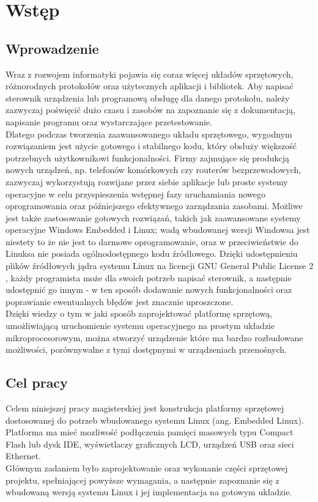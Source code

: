 \documentclass[a4paper,12pt]{book}
\begin{document}
	\tableofcontents


	\chapter{Wstęp}
		\section{Wprowadzenie}
			Wraz z rozwojem informatyki pojawia się coraz więcej układów sprzętowych, różnorodnych protokołów oraz użytecznych aplikacji i bibliotek. Aby napisać sterownik urządzenia lub programową obsługę dla danego protokołu, należy zazwyczaj poświęcić dużo czasu i zasobów na zapoznanie się z dokumentacją, napisanie programu oraz wystarczające przetestowanie.\\
			Dlatego podczas tworzenia zaawansowanego układu sprzętowego, wygodnym rozwiązaniem jest użycie gotowego i stabilnego kodu, który obsłuży większość potrzebnych użytkownikowi funkcjonalności. Firmy zajmujące się produkcją nowych urządzeń, np. telefonów komórkowych czy routerów bezprzewodowych, zazwyczaj wykorzystują rozwijane przez siebie aplikacje lub proste systemy operacyjne w celu przyspieszenia wstępnej fazy uruchamiania nowego oprogramowania oraz późniejszego efektywnego zarządzania zasobami. Możliwe jest także zastosowanie gotowych rozwiązań, takich jak zaawansowane systemy operacyjne Windows Embedded i Linux; wadą wbudowanej wersji Windowsa jest niestety to że nie jest to darmowe oprogramowanie, oraz w przeciwieństwie do Linuksa nie posiada ogólnodostępnego kodu źródłowego. Dzięki udostępnieniu plików źródłowych jądra systemu Linux na licencji GNU General Public License 2 \cite{gnu_gpl_v2}, każdy programista może dla swoich potrzeb napisać sterownik, a następnie udostępnić go innym - w ten sposób dodawanie nowych funkcjonalności oraz poprawianie ewentualnych błędów jest znacznie uproszczone.\\
			Dzięki wiedzy o tym w jaki sposób zaprojektować platformę sprzętową, umożliwiającą uruchomienie systemu operacyjnego na prostym układzie mikroprocesorowym, można stworzyć urządzenie które ma bardzo rozbudowane możliwości, porównywalne z tymi dostępnymi w urządzeniach przenośnych.
		\section{Cel pracy}
			Celem niniejszej pracy magisterskiej jest konstrukcja platformy sprzętowej dostosowanej do potrzeb wbudowanego systemu Linux (ang. Embedded Linux). Platforma ma mieć mozliwość podłączenia pamięci masowych typu Compact  Flash lub dysk IDE, wyświetlaczy graficznych LCD, urządzeń USB oraz sieci Ethernet.\\
			Głównym zadaniem było zaprojektowanie oraz wykonanie części sprzętowej projektu, spełniającej powyższe wymagania, a następnie zapoznanie się z wbudowaną wersją systemu Linux i jej implementacja na gotowym układzie.\\
\end{document}
